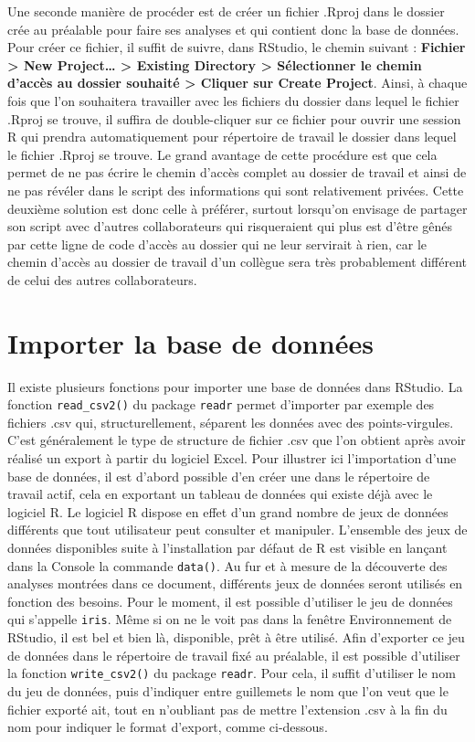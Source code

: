 \documentclass[
  french,
]{book}
\begin{document}
Une seconde manière de procéder est de créer un fichier .Rproj dans le dossier crée au préalable pour faire ses analyses et qui contient donc la base de données. Pour créer ce fichier, il suffit de suivre, dans RStudio, le chemin suivant : \textbf{Fichier \textgreater{} New Project\ldots{} \textgreater{} Existing Directory \textgreater{} Sélectionner le chemin d'accès au dossier souhaité \textgreater{} Cliquer sur Create Project}. Ainsi, à chaque fois que l'on souhaitera travailler avec les fichiers du dossier dans lequel le fichier .Rproj se trouve, il suffira de double-cliquer sur ce fichier pour ouvrir une session R qui prendra automatiquement pour répertoire de travail le dossier dans lequel le fichier .Rproj se trouve. Le grand avantage de cette procédure est que cela permet de ne pas écrire le chemin d'accès complet au dossier de travail et ainsi de ne pas révéler dans le script des informations qui sont relativement privées. Cette deuxième solution est donc celle à préférer, surtout lorsqu'on envisage de partager son script avec d'autres collaborateurs qui risqueraient qui plus est d'être gênés par cette ligne de code d'accès au dossier qui ne leur servirait à rien, car le chemin d'accès au dossier de travail d'un collègue sera très probablement différent de celui des autres collaborateurs.

\hypertarget{importer-la-base-de-donnuxe9es}{%
\section{Importer la base de données}\label{importer-la-base-de-donnuxe9es}}

Il existe plusieurs fonctions pour importer une base de données dans RStudio. La fonction \texttt{read\_csv2()} du package \texttt{readr} permet d'importer par exemple des fichiers .csv qui, structurellement, séparent les données avec des points-virgules. C'est généralement le type de structure de fichier .csv que l'on obtient après avoir réalisé un export à partir du logiciel Excel. Pour illustrer ici l'importation d'une base de données, il est d'abord possible d'en créer une dans le répertoire de travail actif, cela en exportant un tableau de données qui existe déjà avec le logiciel R. Le logiciel R dispose en effet d'un grand nombre de jeux de données différents que tout utilisateur peut consulter et manipuler. L'ensemble des jeux de données disponibles suite à l'installation par défaut de R est visible en lançant dans la Console la commande \texttt{data()}. Au fur et à mesure de la découverte des analyses montrées dans ce document, différents jeux de données seront utilisés en fonction des besoins. Pour le moment, il est possible d'utiliser le jeu de données qui s'appelle \texttt{iris}. Même si on ne le voit pas dans la fenêtre Environnement de RStudio, il est bel et bien là, disponible, prêt à être utilisé. Afin d'exporter ce jeu de données dans le répertoire de travail fixé au préalable, il est possible d'utiliser la fonction \texttt{write\_csv2()} du package \texttt{readr}. Pour cela, il suffit d'utiliser le nom du jeu de données, puis d'indiquer entre guillemets le nom que l'on veut que le fichier exporté ait, tout en n'oubliant pas de mettre l'extension .csv à la fin du nom pour indiquer le format d'export, comme ci-dessous.
\end{document}
